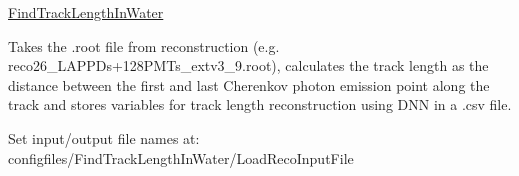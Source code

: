 \hyperlink{classFindTrackLengthInWater}{Find\-Track\-Length\-In\-Water}


\begin{DoxyItemize}
\item Takes the .root file from reconstruction (e.\-g. reco26\-\_\-L\-A\-P\-P\-Ds+128\-P\-M\-Ts\-\_\-extv3\-\_\-9.root), calculates the track length as the distance between the first and last Cherenkov photon emission point along the track and stores variables for track length reconstruction using D\-N\-N in a .csv file.
\item Set input/output file names at\-: configfiles/\-Find\-Track\-Length\-In\-Water/\-Load\-Reco\-Input\-File 
\end{DoxyItemize}